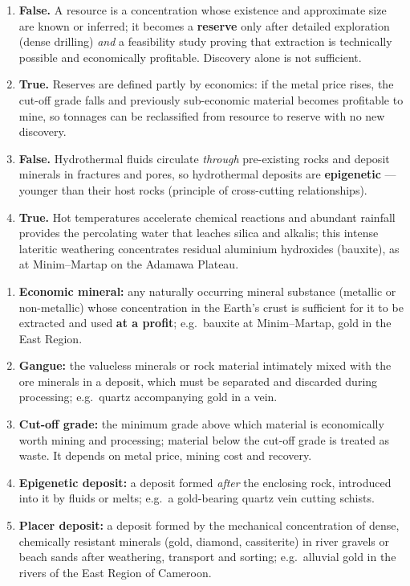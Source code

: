 \documentclass[11pt]{article}
\begin{document}
\begin{corrige}
\begin{enumerate}
\item \textbf{False.} A resource is a concentration whose existence and approximate size are known or inferred; it becomes a \textbf{reserve} only after detailed exploration (dense drilling) \emph{and} a feasibility study proving that extraction is technically possible and economically profitable. Discovery alone is not sufficient.
\item \textbf{True.} Reserves are defined partly by economics: if the metal price rises, the cut-off grade falls and previously sub-economic material becomes profitable to mine, so tonnages can be reclassified from resource to reserve with no new discovery.
\item \textbf{False.} Hydrothermal fluids circulate \emph{through} pre-existing rocks and deposit minerals in fractures and pores, so hydrothermal deposits are \textbf{epigenetic} — younger than their host rocks (principle of cross-cutting relationships).
\item \textbf{True.} Hot temperatures accelerate chemical reactions and abundant rainfall provides the percolating water that leaches silica and alkalis; this intense lateritic weathering concentrates residual aluminium hydroxides (bauxite), as at Minim--Martap on the Adamawa Plateau.
\end{enumerate}
\end{corrige}

\begin{corrige}
\begin{enumerate}
\item \textbf{Economic mineral:} any naturally occurring mineral substance (metallic or non-metallic) whose concentration in the Earth's crust is sufficient for it to be extracted and used \textbf{at a profit}; e.g.\ bauxite at Minim--Martap, gold in the East Region.
\item \textbf{Gangue:} the valueless minerals or rock material intimately mixed with the ore minerals in a deposit, which must be separated and discarded during processing; e.g.\ quartz accompanying gold in a vein.
\item \textbf{Cut-off grade:} the minimum grade above which material is economically worth mining and processing; material below the cut-off grade is treated as waste. It depends on metal price, mining cost and recovery.
\item \textbf{Epigenetic deposit:} a deposit formed \emph{after} the enclosing rock, introduced into it by fluids or melts; e.g.\ a gold-bearing quartz vein cutting schists.
\item \textbf{Placer deposit:} a deposit formed by the mechanical concentration of dense, chemically resistant minerals (gold, diamond, cassiterite) in river gravels or beach sands after weathering, transport and sorting; e.g.\ alluvial gold in the rivers of the East Region of Cameroon.
\end{enumerate}
\end{corrige}
\end{document}
